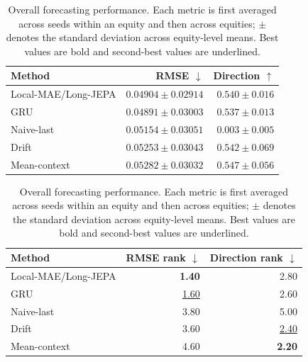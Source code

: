 \begin{table}[t]
\centering
\small
\caption{Overall forecasting performance. Each metric is first averaged across seeds within an equity and then across equities; $\pm$ denotes the standard deviation across equity-level means. Best values are bold and second-best values are underlined.}
\label{tab:main_metrics}
\begin{tabular}{lrr}
\toprule
Method & RMSE $\downarrow$ & Direction $\uparrow$ \\
\midrule
Local-MAE/Long-JEPA & \underline{$0.04904 \pm 0.02914$} & $0.540 \pm 0.016$ \\
GRU & \textbf{$0.04891 \pm 0.03003$} & $0.537 \pm 0.013$ \\
Naive-last & $0.05154 \pm 0.03051$ & $0.003 \pm 0.005$ \\
Drift & $0.05253 \pm 0.03043$ & \underline{$0.542 \pm 0.069$} \\
Mean-context & $0.05282 \pm 0.03032$ & \textbf{$0.547 \pm 0.056$} \\
\bottomrule
\end{tabular}
\par\medskip
\begin{tabular}{lrr}
\toprule
Method & RMSE rank $\downarrow$ & Direction rank $\downarrow$ \\
\midrule
Local-MAE/Long-JEPA & \textbf{1.40} & 2.80 \\
GRU & \underline{1.60} & 2.60 \\
Naive-last & 3.80 & 5.00 \\
Drift & 3.60 & \underline{2.40} \\
Mean-context & 4.60 & \textbf{2.20} \\
\bottomrule
\end{tabular}
\end{table}
